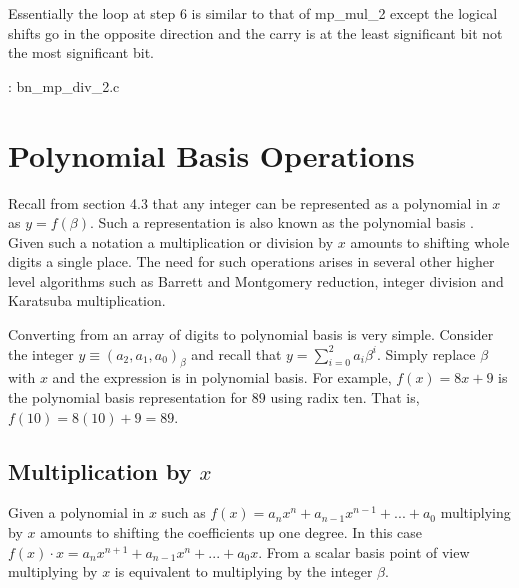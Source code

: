 \documentclass[b5paper]{book}
\begin{document}
Essentially the loop at step 6 is similar to that of mp\_mul\_2 except the logical shifts go in the opposite direction and the carry is at the 
least significant bit not the most significant bit.  

\vspace{+3mm}\begin{small}
\hspace{-5.1mm}{\bf File}: bn\_mp\_div\_2.c
\vspace{-3mm}
\begin{alltt}
\end{alltt}
\end{small}

\section{Polynomial Basis Operations}
Recall from section 4.3 that any integer can be represented as a polynomial in $x$ as $y = f(\beta)$.  Such a representation is also known as
the polynomial basis \cite[pp. 48]{ROSE}. Given such a notation a multiplication or division by $x$ amounts to shifting whole digits a single 
place.  The need for such operations arises in several other higher level algorithms such as Barrett and Montgomery reduction, integer
division and Karatsuba multiplication.  

Converting from an array of digits to polynomial basis is very simple.  Consider the integer $y \equiv (a_2, a_1, a_0)_{\beta}$ and recall that
$y = \sum_{i=0}^{2} a_i \beta^i$.  Simply replace $\beta$ with $x$ and the expression is in polynomial basis.  For example, $f(x) = 8x + 9$ is the
polynomial basis representation for $89$ using radix ten.  That is, $f(10) = 8(10) + 9 = 89$.  

\subsection{Multiplication by $x$}

Given a polynomial in $x$ such as $f(x) = a_n x^n + a_{n-1} x^{n-1} + ... + a_0$ multiplying by $x$ amounts to shifting the coefficients up one 
degree.  In this case $f(x) \cdot x = a_n x^{n+1} + a_{n-1} x^n + ... + a_0 x$.  From a scalar basis point of view multiplying by $x$ is equivalent to
multiplying by the integer $\beta$.  
\end{document}
